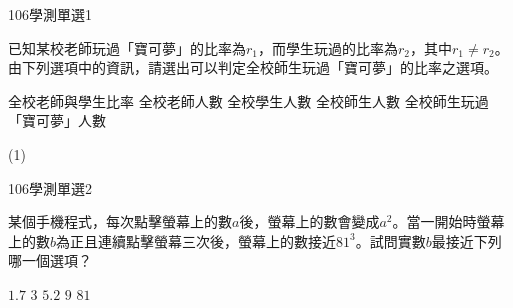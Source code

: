 \begin{QUESTIONS}
    \begin{QUESTION}
        \begin{ExamInfo}{106}{學測}{單選}{1}
        \end{ExamInfo}
        \begin{ExamAnsRateInfo}{53}{82}{52}{25}
        \end{ExamAnsRateInfo}
        \begin{QBODY}
            已知某校老師玩過「寶可夢」的比率為${{r}_{1}}$，而學生玩過的比率為${{r}_{2}}$，其中${{r}_{1}}\ne {{r}_{2}}$。
            由下列選項中的資訊，請選出可以判定全校師生玩過「寶可夢」的比率之選項。
            \begin{QOPS}
                \QOP 全校老師與學生比率     
                \QOP 全校老師人數
                \QOP 全校學生人數
                \QOP 全校師生人數
                \QOP 全校師生玩過「寶可夢」人數
            \end{QOPS}
        \end{QBODY}
        \begin{QFROMS}
        \end{QFROMS}
        \begin{QTAGS}\end{QTAGS}
        \begin{QANS}
            (1)
        \end{QANS}
        \begin{QSOLLIST}
        \end{QSOLLIST}
        \begin{QEMPTYSPACE}
        \end{QEMPTYSPACE}
    \end{QUESTION}
    \begin{QUESTION}
        \begin{ExamInfo}{106}{學測}{單選}{2}
        \end{ExamInfo}
        \begin{ExamAnsRateInfo}{51}{84}{52}{17}
        \end{ExamAnsRateInfo}
        \begin{QBODY}
		    某個手機程式，每次點擊螢幕上的數$a$後，螢幕上的數會變成${{a}^{2}}$。當一開始時螢幕上的數$b$為正且連續點擊螢幕三次後，螢幕上的數接近${{81}^{3}}$。試問實數$b$最接近下列哪一個選項？
			\begin{QOPS}
				\QOP $1.7$      
				\QOP $3$      
				\QOP $5.2$      
				\QOP $9$      
				\QOP $81$

\end{QOPS}
\end{QBODY}
\end{QUESTION}
\end{QUESTIONS}
